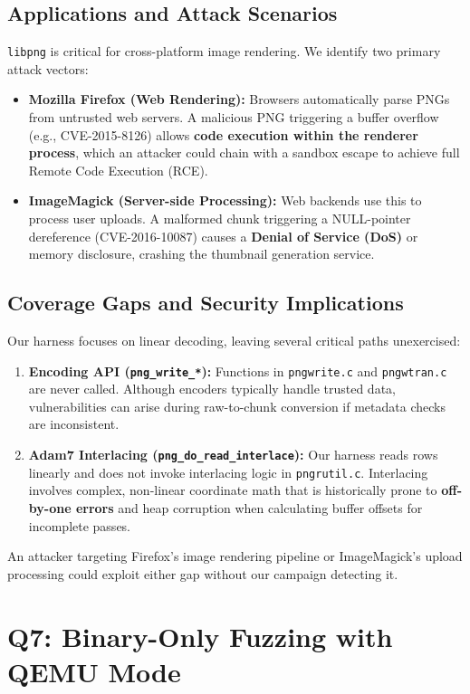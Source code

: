 \documentclass[letterpaper,twocolumn,10pt]{article}
\begin{document}
\subsection{Applications and Attack Scenarios}
\texttt{libpng} is critical for cross-platform image rendering. We identify two primary attack vectors:
\begin{itemize}[leftmargin=*]
    \item \textbf{Mozilla Firefox (Web Rendering):} Browsers automatically parse PNGs from untrusted web servers. A malicious PNG triggering a buffer overflow (e.g., CVE-2015-8126) allows \textbf{code execution within the renderer process}, which an attacker could chain with a sandbox escape to achieve full Remote Code Execution (RCE).
    \item \textbf{ImageMagick (Server-side Processing):} Web backends use this to process user uploads. A malformed chunk triggering a NULL-pointer dereference (CVE-2016-10087) causes a \textbf{Denial of Service (DoS)} or memory disclosure, crashing the thumbnail generation service.
\end{itemize}

\subsection{Coverage Gaps and Security Implications}
Our harness focuses on linear decoding, leaving several critical paths unexercised:
\begin{enumerate}[leftmargin=*]
    \item \textbf{Encoding API (\texttt{png\_write\_*}):} Functions in \texttt{pngwrite.c} and \texttt{pngwtran.c} are never called. Although encoders typically handle trusted data, vulnerabilities can arise during raw-to-chunk conversion if metadata checks are inconsistent.
    \item \textbf{Adam7 Interlacing (\texttt{png\_do\_read\_interlace}):} Our harness reads rows linearly and does not invoke interlacing logic in \texttt{pngrutil.c}. Interlacing involves complex, non-linear coordinate math that is historically prone to \textbf{off-by-one errors} and heap corruption when calculating buffer offsets for incomplete passes.
\end{enumerate}
An attacker targeting Firefox's image rendering pipeline or ImageMagick's upload processing could exploit either gap without our campaign detecting it.


\section{Q7: Binary-Only Fuzzing with QEMU Mode}
\end{document}
